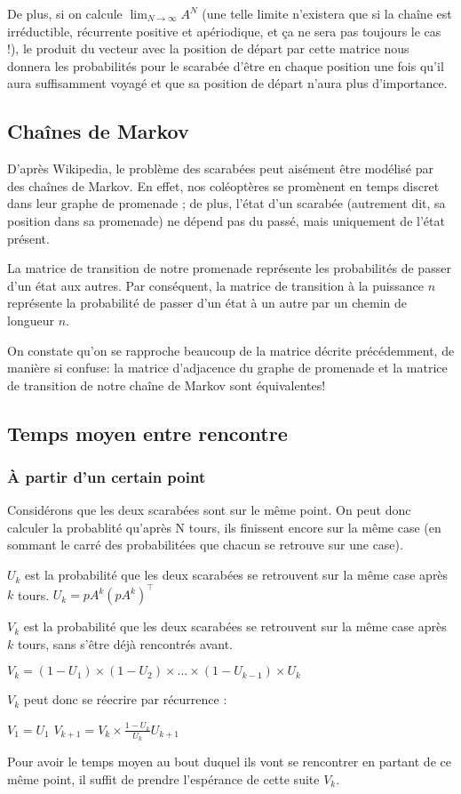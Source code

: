 \documentclass{scrartcl} \usepackage[utf8]{inputenc}
\begin{document}
  De plus, si on calcule $\lim_{N \to \infty} A^N$ (une telle limite
  n'existera que si la chaîne est irréductible, récurrente positive et
  apériodique, et ça ne sera pas toujours le cas !), le produit du
  vecteur avec la position de départ par cette matrice nous donnera
  les probabilités pour le scarabée d'être en chaque position une fois
  qu'il aura suffisamment voyagé et que sa position de départ n'aura
  plus d'importance.

  \subsection{Chaînes de Markov}

  D'après Wikipedia, le problème des scarabées peut aisément être
  modélisé par des chaînes de Markov. En effet, nos coléoptères se
  promènent en temps discret dans leur graphe de promenade ; de plus,
  l'état d'un scarabée (autrement dit, sa position dans sa promenade)
  ne dépend pas du passé, mais uniquement de l'état présent.

  La matrice de transition de notre promenade représente les
  probabilités de passer d'un état aux autres. Par conséquent, la
  matrice de transition à la puissance $n$ représente la probabilité
  de passer d'un état à un autre par un chemin de longueur $n$.

  On constate qu'on se rapproche beaucoup de la matrice décrite
  précédemment, de manière si confuse: la matrice d'adjacence du
  graphe de promenade et la matrice de transition de notre chaîne de
  Markov sont équivalentes!

\subsection{Temps moyen entre rencontre}

\subsubsection{À partir d'un certain point}

Considérons que les deux scarabées sont sur le même point.
On peut donc calculer la probablité qu'après N tours, ils finissent encore sur la même case (en sommant le carré des probabilitées
que chacun se retrouve sur une case).

$U_k$ est la probabilité que les deux scarabées se retrouvent sur la même case après $k$ tours.
$U_k = pA^k(pA^k)^\intercal$

$V_k$ est la probabilité que les deux scarabées se retrouvent sur la même case après $k$ tours, sans s'être déjà rencontrés avant.

$V_k = (1 - U_1) \times (1 - U_2) \times ... \times (1 - U_{k - 1}) \times U_k$

$V_k$ peut donc se réecrire par récurrence :

$V_1 = U_1$
$V_{k + 1} = V_k \times \frac{1 - U_k}{U_k}U_{k + 1}$

Pour avoir le temps moyen au bout duquel ils vont se rencontrer en partant de ce même point, il suffit de prendre l'espérance de cette suite $V_k$.
\end{document}
